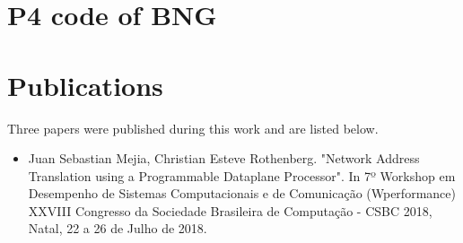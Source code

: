 \begin{anexosenv}

\partanexos

\chapter{P4 code of BNG}
\label{annex:p4code}


\chapter{Publications}
\label{AnnexB}
Three papers were published during this work and are listed below. 

\begin{itemize}

    \item Juan Sebastian Mejia, Christian Esteve Rothenberg. "Network Address Translation using a Programmable Dataplane Processor". In 7º Workshop em Desempenho de Sistemas Computacionais e de Comunicação (Wperformance) XXVIII Congresso da Sociedade Brasileira de Computação - CSBC 2018, Natal, 22 a 26 de Julho de 2018.

  
\end{itemize}


\label{annex:NetPDLdesc}

\end{anexosenv}


\printindex

 